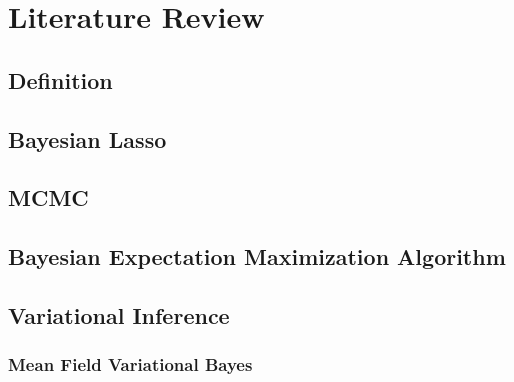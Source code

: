 \chapter{Literature Review}
\label{Chapter2}
\section{Definition}

\section{Bayesian Lasso}

\section{MCMC}

\section{Bayesian Expectation Maximization Algorithm}

\section{Variational Inference}
\subsection{Mean Field Variational Bayes}


